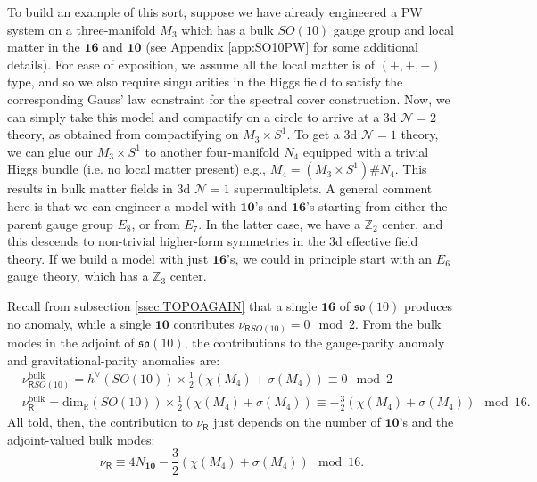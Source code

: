 \documentclass[12pt]{article}%
\numberwithin{equation}{section}
\renewcommand{\(}{\left(}
\renewcommand{\)}{\right)}
\renewcommand{\[}{\left[}
\renewcommand{\]}{\right]}
\begin{document}
To build an example of this sort, suppose we have already engineered a PW system on a three-manifold $M_3$ which
has a bulk $SO(10)$ gauge group and local matter in the $\mathbf{16}$ and $\mathbf{10}$ (see Appendix \ref{app:SO10PW} for
some additional details). For ease of exposition, we assume all the local matter is of $(+,+,-)$ type, and so we also require singularities in the Higgs field to satisfy the corresponding Gauss' law constraint for the spectral cover construction.
Now, we can simply take this model and compactify on a circle to arrive at a 3d $\mathcal{N} = 2$ theory,
as obtained from compactifying on $M_3 \times S^1$. To get a 3d $\mathcal{N} = 1$ theory, we can glue our $M_3 \times S^1$ to another four-manifold $N_4$ equipped with a trivial Higgs bundle (i.e. no local matter present)  e.g.,
$M_4 = (M_3 \times S^1) \# N_4$. This results in bulk matter fields in 3d $\mathcal{N} = 1$ supermultiplets. A general comment here is that we can engineer a model with $\mathbf{10}$'s and $\mathbf{16}$'s starting from either the parent gauge group $E_8$, or from $E_7$. In the latter case,
we have a $\mathbb{Z}_2$ center, and this descends to non-trivial higher-form symmetries in the 3d effective field theory. If we build a model with just $\mathbf{16}$'s, we could in principle start with an $E_6$ gauge theory, which has a $\mathbb{Z}_3$ center.


Recall from subsection \ref{ssec:TOPOAGAIN} that a single $\mathbf{16}$ of
$\mathfrak{so}(10)$ produces no anomaly, while a single $\mathbf{10}$ contributes
$\nu_{\mathsf{R} SO(10)} = 0 \mod 2$.
From the bulk modes in the adjoint of $\mathfrak{so}(10)$, the contributions to the
gauge-parity anomaly and gravitational-parity anomalies are:
\begin{align}
& \nu_{\mathsf{R} SO(10)}^{\mathrm{bulk}} = h^{\lor}(SO(10)) \times \frac{1}{2}(\chi(M_4) + \sigma(M_4)) \equiv 0 \mod 2 \\
& \nu_{\mathsf{R}}^{\mathrm{bulk}} = \mathrm{dim}_{\mathbb{R}}(SO(10)) \times \frac{1}{2}(\chi(M_4) + \sigma(M_4)) \equiv
- \frac{3}{2}(\chi(M_4) + \sigma(M_4)) \mod 16.
\end{align}
All told, then, the contribution to $\nu_{\mathsf{R}}$ just depends on the number of $\mathbf{10}$'s
and the adjoint-valued bulk modes:
\begin{equation}
\nu_{\mathsf{R}} \equiv 4 N_{\mathbf{10}} - \frac{3}{2}(\chi(M_4) + \sigma(M_4)) \mod 16.
\end{equation}
\end{document}
